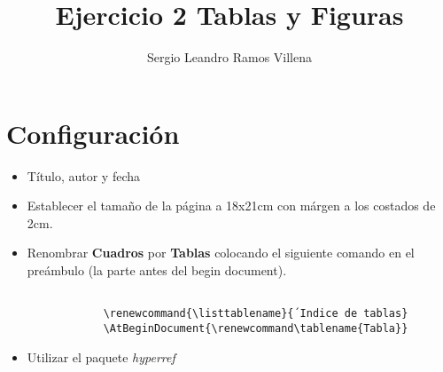\documentclass{article}
\title{Ejercicio 2 Tablas y Figuras}
\author{Sergio Leandro Ramos Villena}
\renewcommand{\listtablename}{Índice de tablas}
\begin{document}
\maketitle


\section{Configuración}
	\begin{itemize}
		\item Título, autor y fecha
		\item Establecer el tamaño de la página a 18x21cm con márgen a los costados de 2cm.
		\item Renombrar \textbf{Cuadros} por \textbf{Tablas} colocando el siguiente comando en el preámbulo (la parte antes del begin document).
			\begin{verbatim}

			\renewcommand{\listtablename}{´Indice de tablas}
			\AtBeginDocument{\renewcommand\tablename{Tabla}}

			\end{verbatim}
		\item Utilizar el paquete \textit{hyperref}
	\end{itemize}
\pagebreak
\end{document}
